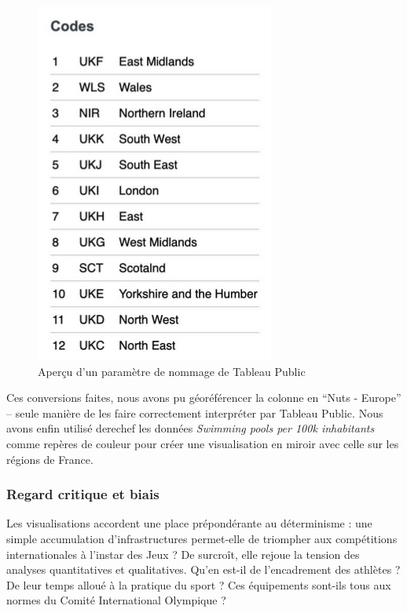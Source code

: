 \documentclass[hidelinks, 12pt]{report}
\begin{document}
\begin{center}
	\begin{figure}[H]
		\centering
		\setlength{\belowcaptionskip}{-35pt}
		\includegraphics[scale=0.5]{images/datavis-swim-fr-eng-codes.png}
		\captionsetup{justification=centering}
		\caption{Aperçu d'un paramètre de nommage de Tableau Public}
	\end{figure}
\end{center}

Ces conversions faites, nous avons pu géoréférencer la colonne en \enquote{Nuts - Europe} -- seule manière de les faire correctement interpréter par Tableau Public. Nous avons enfin utilisé derechef les données \textit{Swimming pools per 100k inhabitants} comme repères de couleur pour créer une visualisation en miroir avec celle sur les régions de France.

\subsubsection{Regard critique et biais}

\label{biais}Les visualisations accordent une place prépondérante au déterminisme : une simple accumulation d'infrastructures permet-elle de triompher aux compétitions internationales à l'instar des Jeux ? De surcroît, elle rejoue la tension des analyses quantitatives et qualitatives. Qu'en est-il de l'encadrement des athlètes ? De leur temps alloué à la pratique du sport ? Ces équipements sont-ils tous aux normes du Comité International Olympique ?
\end{document}
